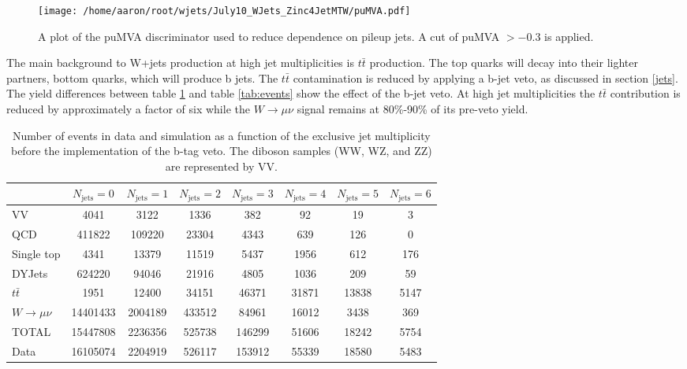\documentclass[oneside, letterpaper, oldfontcommands]{memoir}
\begin{document}
\begin{figure}[!Hhtbp]
\begin{center}
\texttt{[image: /home/aaron/root/wjets/July10\_WJets\_Zinc4JetMTW/puMVA.pdf]}

\end{center}
\caption{A plot of the puMVA discriminator used to reduce dependence on pileup jets. A cut of puMVA $>-0.3$ is applied.}
\label{fig:pumva}
\end{figure}

\qquad The main background to W+jets production at high jet multiplicities is $t\bar{t}$ production. The top quarks will decay into their lighter partners, bottom quarks, which will produce b jets. The $t\bar{t}$ contamination is reduced by applying a b-jet veto, as discussed in section \ref{jets}. The yield differences between table \ref{tab:btag} and table \ref{tab:events} show the effect of the b-jet veto. At high jet multiplicities the $t\bar{t}$ contribution is reduced by approximately a factor of six while the $W \rightarrow \mu\nu$ signal remains at 80\%-90\% of its pre-veto yield.

\begin{table}\small
\centering
\caption{Number of events in data and simulation as a function of the exclusive jet multiplicity before the implementation of the b-tag veto. The diboson samples (WW, WZ, and ZZ) are represented by VV.}
\begin{tabular}{l|ccccccc}
  &  $N_{\text{jets}} = 0 $ & $N_{\text{jets}} = 1 $ & $N_{\text{jets}} = 2 $ & $N_{\text{jets}} = 3 $ & $N_{\text{jets}} = 4 $ & $N_{\text{jets}} = 5 $ & $N_{\text{jets}} = 6 $ \\ \hline
   VV        & 4041 & 3122 & 1336 & 382 & 92 & 19 & 3  \\
   QCD        & 411822 & 109220 & 23304 & 4343 & 639 & 126 & 0  \\
   Single top        & 4341 & 13379 & 11519 & 5437 & 1956 & 612 & 176 \\
   DYJets        & 624220 & 94046 & 21916 & 4805 & 1036 & 209 & 59 \\
   $t\bar{t}$        & 1951 & 12400 & 34151 & 46371 & 31871 & 13838 & 5147 \\
   $W \rightarrow \mu\nu$        & 14401433 & 2004189 & 433512 & 84961 & 16012 & 3438 & 369 \\
 \hline
 TOTAL & 15447808 & 2236356 & 525738 & 146299 & 51606 & 18242 & 5754 \\
 \hline
 Data          & 16105074 & 2204919 & 526117 & 153912 & 55339 & 18580 & 5483 \\
 \end{tabular}
\label{tab:btag}
\end{table}
\end{document}

